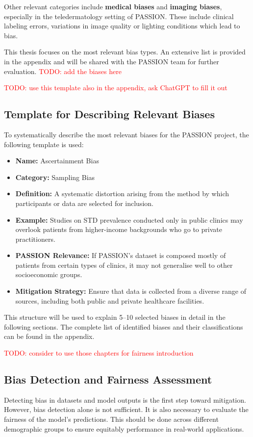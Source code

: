 \documentclass[12pt, a4paper, oneside]{book}   	%
\renewcommand{\todo}[1]{\textcolor{red}{TODO: #1}}
\begin{document}
		Other relevant categories include \textbf{medical biases} and \textbf{imaging biases}, especially in the teledermatology setting of PASSION. These include clinical labeling errors, variations in image quality or lighting conditions which lead to bias.
		
		
		This thesis focuses on the most relevant bias types. An extensive list is provided in the appendix and will be shared with the PASSION team for further evaluation. \todo{add the biases here}
		
		
		\todo{use this template also in the appendix, ask ChatGPT to fill it out}
			\subsection{Template for Describing Relevant Biases}
			To systematically describe the most relevant biases for the PASSION project, the following template is used:
			
			\begin{itemize}
				\item \textbf{Name:} Ascertainment Bias
				\item \textbf{Category:} Sampling Bias
				\item \textbf{Definition:} A systematic distortion arising from the method by which participants or data are selected for inclusion.
				\item \textbf{Example:} Studies on STD prevalence conducted only in public clinics may overlook patients from higher-income backgrounds who go to private practitioners.
				\item \textbf{PASSION Relevance:} If PASSION’s dataset is composed mostly of patients from certain types of clinics, it may not generalise well to other socioeconomic groups.
				\item \textbf{Mitigation Strategy:} Ensure that data is collected from a diverse range of sources, including both public and private healthcare facilities.
			\end{itemize}
			
			This structure will be used to explain 5–10 selected biases in detail in the following sections. The complete list of identified biases and their classifications can be found in the appendix.
		
		\todo{consider to use those chapters for fairness introduction}
		\subsection{Bias Detection and Fairness Assessment}
		Detecting bias in datasets and model outputs is the first step toward mitigation. However, bias detection alone is not sufficient. It is also necessary to evaluate the fairness of the model’s predictions. This should be done across different demographic groups to ensure equitably performance in real-world applications.
		
\end{document}

